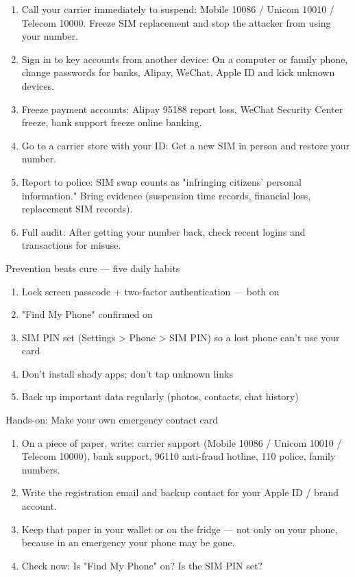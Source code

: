 \begin{enumerate}
  \item Call your carrier immediately to suspend: Mobile 10086 / Unicom 10010 / Telecom 10000. Freeze SIM replacement and stop the attacker from using your number.
  \item Sign in to key accounts from another device: On a computer or family phone, change passwords for banks, Alipay, WeChat, Apple ID and kick unknown devices.
  \item Freeze payment accounts: Alipay 95188 report loss, WeChat Security Center freeze, bank support freeze online banking.
  \item Go to a carrier store with your ID: Get a new SIM in person and restore your number.
  \item Report to police: SIM swap counts as "infringing citizens' personal information." Bring evidence (suspension time records, financial loss, replacement SIM records).
  \item Full audit: After getting your number back, check recent logins and transactions for misuse.
\end{enumerate}

\begin{tcbwarn}{Prevention beats cure — five daily habits}
\begin{enumerate}
  \item Lock screen passcode + two-factor authentication — both on
  \item "Find My Phone" confirmed on
  \item SIM PIN set (Settings > Phone > SIM PIN) so a lost phone can't use your card
  \item Don't install shady apps; don't tap unknown links
  \item Back up important data regularly (photos, contacts, chat history)
\end{enumerate}

\end{tcbwarn}

\begin{tcbpractice}{Hands-on: Make your own emergency contact card}
\begin{enumerate}
  \item On a piece of paper, write: carrier support (Mobile 10086 / Unicom 10010 / Telecom 10000), bank support, 96110 anti-fraud hotline, 110 police, family numbers.
  \item Write the registration email and backup contact for your Apple ID / brand account.
  \item Keep that paper in your wallet or on the fridge — not only on your phone, because in an emergency your phone may be gone.
  \item Check now: Is "Find My Phone" on? Is the SIM PIN set?
\end{enumerate}

\end{tcbpractice}

